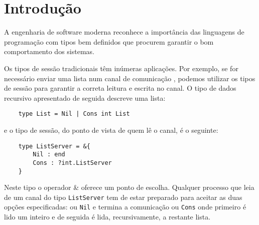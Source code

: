 
\section{Introdução}
\label{sec:intro}

A engenharia de software moderna reconhece a importância das linguagens de programação com tipos bem definidos que procurem garantir o bom comportamento dos sistemas.



Os tipos de sessão tradicionais têm inúmeras aplicações. Por exemplo, se for necessário enviar uma lista num canal de comunicação \cite{ref-lang-primitives}, podemos utilizar os tipos de sessão para garantir a correta leitura e escrita no canal. O tipo de dados recursivo apresentado de seguida descreve uma lista:
\begin{lstlisting}
	type List = Nil | Cons int List
\end{lstlisting}
e o tipo de sessão, do ponto de vista de quem lê o canal, é o seguinte:
\begin{lstlisting}
	type ListServer = &{
		Nil : end
		Cons : ?int.ListServer
	}
\end{lstlisting}

Neste tipo o operador \& oferece um ponto de escolha. Qualquer processo que leia de um canal do tipo \lstinline"ListServer" tem de estar preparado para aceitar as duas opções especificadas: ou \lstinline"Nil" e termina a comunicação ou \lstinline"Cons" onde primeiro é lido um inteiro e de seguida é lida, recursivamente, a restante lista.

